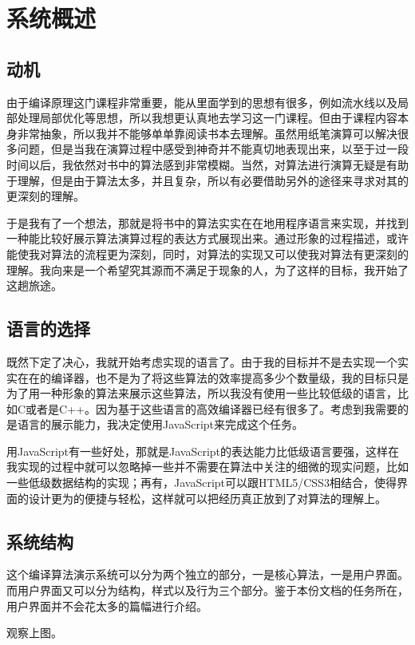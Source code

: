 \chapter{系统概述}

\section{动机}

由于编译原理这门课程非常重要，能从里面学到的思想有很多，例如流水线以及局部处理局部优化等思想，所以我想更认真地去学习这一门课程。但由于课程内容本身非常抽象，所以我并不能够单单靠阅读书本去理解。虽然用纸笔演算可以解决很多问题，但是当我在演算过程中感受到神奇并不能真切地表现出来，以至于过一段时间以后，我依然对书中的算法感到非常模糊。当然，对算法进行演算无疑是有助于理解，但是由于算法太多，并且复杂，所以有必要借助另外的途径来寻求对其的更深刻的理解。

于是我有了一个想法，那就是将书中的算法实实在在地用程序语言来实现，并找到一种能比较好展示算法演算过程的表达方式展现出来。通过形象的过程描述，或许能使我对算法的流程更为深刻，同时，对算法的实现又可以使我对算法有更深刻的理解。我向来是一个希望究其源而不满足于现象的人，为了这样的目标，我开始了这趟旅途。

\section{语言的选择}

既然下定了决心，我就开始考虑实现的语言了。由于我的目标并不是去实现一个实实在在的编译器，也不是为了将这些算法的效率提高多少个数量级，我的目标只是为了用一种形象的算法来展示这些算法，所以我没有使用一些比较低级的语言，比如C或者是C++。因为基于这些语言的高效编译器已经有很多了。考虑到我需要的是语言的展示能力，我决定使用JavaScript来完成这个任务。

用JavaScript有一些好处，那就是JavaScript的表达能力比低级语言要强，这样在我实现的过程中就可以忽略掉一些并不需要在算法中关注的细微的现实问题，比如一些低级数据结构的实现；再有，JavaScript可以跟HTML5/CSS3相结合，使得界面的设计更为的便捷与轻松，这样就可以把经历真正放到了对算法的理解上。

\section{系统结构}

这个编译算法演示系统可以分为两个独立的部分，一是核心算法，一是用户界面。而用户界面又可以分为结构，样式以及行为三个部分。鉴于本份文档的任务所在，用户界面并不会花太多的篇幅进行介绍。



观察上图。
